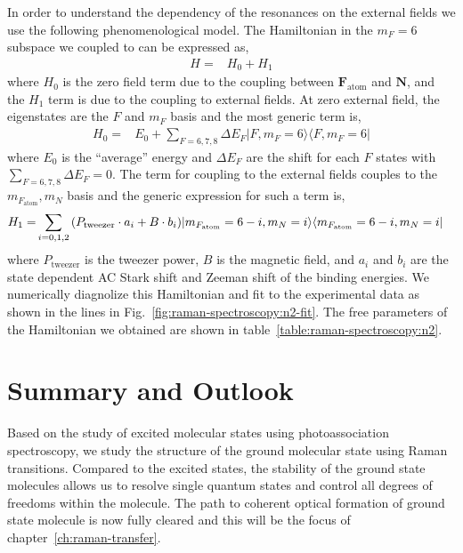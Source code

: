 In order to understand the dependency of the resonances on the external fields
we use the following phenomenological model.
The Hamiltonian in the $m_F=6$ subspace we coupled to can be expressed as,
\begin{align*}
  H=&H_0+H_1
\end{align*}
where $H_0$ is the zero field term due to the coupling
between $\mathbf{F}_{\mathrm{atom}}$ and $\mathbf{N}$,
and the $H_1$ term is due to the coupling to external fields.
At zero external field, the eigenstates are the $F$ and $m_F$ basis
and the most generic term is,
\begin{align*}
  H_0=&E_0+\!\!\sum_{F=6,7,8}\Delta E_F|F,m_F=6\rangle\langle F,m_F=6|
\end{align*}
where $E_0$ is the ``average'' energy and $\Delta E_F$ are the shift for each $F$ states
with $\sum_{F=6,7,8}\Delta E_F = 0$.
The term for coupling to the external fields couples to the $m_{F_\mathrm{atom}},m_N$ basis
and the generic expression for such a term is,
\begin{align*}
  H_1=&\sum_{i=0,1,2}{\left({P_{\mathrm{tweezer}}\cdot a_i+B\cdot b_i}\right)}|m_{F_\mathrm{atom}}=6-i,m_N=i\rangle\langle m_{F_\mathrm{atom}}=6-i,m_N=i|
\end{align*}
where $P_{\mathrm{tweezer}}$ is the tweezer power, $B$ is the magnetic field,
and $a_i$ and $b_i$ are the state dependent AC Stark shift and Zeeman shift
of the binding energies.
We numerically diagnolize this Hamiltonian and fit to the experimental data
as shown in the lines in Fig.~\ref{fig:raman-spectroscopy:n2-fit}.
The free parameters of the Hamiltonian we obtained are shown in
table~\ref{table:raman-spectroscopy:n2}.

\section{Summary and Outlook}
\label{ch:raman-spectroscopy:summary}
Based on the study of excited molecular states using photoassociation spectroscopy,
we study the structure of the ground molecular state using Raman transitions.
Compared to the excited states, the stability of the ground state molecules
allows us to resolve single quantum states and
control all degrees of freedoms within the molecule.
The path to coherent optical formation of ground state molecule
is now fully cleared and this will be the focus of chapter~\ref{ch:raman-transfer}.
